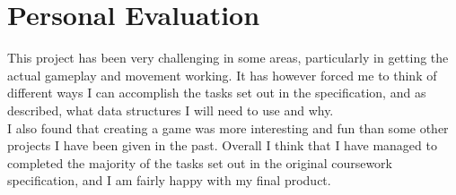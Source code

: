 \documentclass[10pt, a4paper]{article}
\begin{document}
\section{Personal Evaluation}
This project has been very challenging in some areas, particularly in getting the actual gameplay and movement working. It has however forced me to think of different ways I can accomplish the tasks set out in the specification, and as described, what data structures I will need to use and why.
\newline
\\
I also found that creating a game was more interesting and fun than some other projects I have been given in the past. Overall I think that I have managed to completed the majority of the tasks set out in the original coursework specification, and I am fairly happy with my final product.
\end{document}
